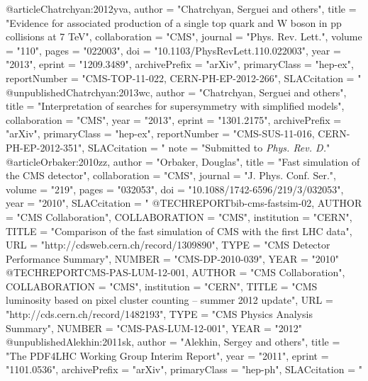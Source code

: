 @article{Chatrchyan:2012yva,
      author         = "Chatrchyan, Serguei and others",
      title          = "{Evidence for associated production of a single top quark
                        and W boson in pp collisions at 7 TeV}",
      collaboration  = "CMS",
      journal        = "Phys. Rev. Lett.",
      volume         = "110",
      pages          = "022003",
      doi            = "10.1103/PhysRevLett.110.022003",
      year           = "2013",
      eprint         = "1209.3489",
      archivePrefix  = "arXiv",
      primaryClass   = "hep-ex",
      reportNumber   = "CMS-TOP-11-022, CERN-PH-EP-2012-266",
      SLACcitation   = "%
}
@unpublished{Chatrchyan:2013wc,
      author         = "Chatrchyan, Serguei and others",
      title          = "{Interpretation of searches for supersymmetry with
                        simplified models}",
      collaboration  = "CMS",
      year           = "2013",
      eprint         = "1301.2175",
      archivePrefix  = "arXiv",
      primaryClass   = "hep-ex",
      reportNumber   = "CMS-SUS-11-016, CERN-PH-EP-2012-351",
      SLACcitation   = "%
      note          = "Submitted to {\it Phys. Rev. D.}"
}
@article{Orbaker:2010zz,
      author         = "Orbaker, Douglas",
      title          = "{Fast simulation of the {CMS} detector}",
      collaboration  = "CMS",
      journal        = "J. Phys. Conf. Ser.",
      volume         = "219",
      pages          = "032053",
      doi            = "10.1088/1742-6596/219/3/032053",
      year           = "2010",
      SLACcitation   = "%
}
@TECHREPORT{bib-cms-fastsim-02,
  AUTHOR      = "{CMS Collaboration}",
  COLLABORATION = "CMS",
  institution    = "CERN",
  TITLE       = "Comparison of the fast simulation of {CMS} with the first {LHC} data",
  URL         = "http://cdsweb.cern.ch/record/1309890",
  TYPE        = "CMS Detector Performance Summary",
  NUMBER      = "CMS-DP-2010-039",
  YEAR        = "2010"
}
@TECHREPORT{CMS-PAS-LUM-12-001,
	AUTHOR      = "{CMS Collaboration}",
	COLLABORATION = "{CMS}",
	institution    = "CERN",
        TITLE       = "CMS luminosity based on pixel cluster counting --
                       summer 2012 update",
	URL         =  "http://cds.cern.ch/record/1482193",
        TYPE        = "CMS Physics Analysis Summary",
        NUMBER      = "CMS-PAS-LUM-12-001",
	YEAR        = "2012"
}
@unpublished{Alekhin:2011sk,
      author         = "Alekhin, Sergey and others",
      title          = "{The PDF4LHC Working Group Interim Report}",
      year           = "2011",
      eprint         = "1101.0536",
      archivePrefix  = "arXiv",
      primaryClass   = "hep-ph",
      SLACcitation   = "%
}
